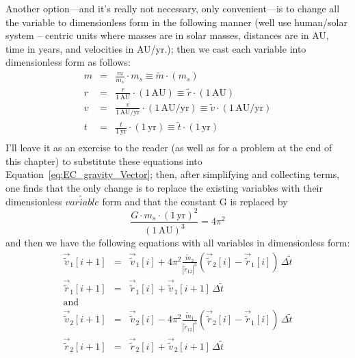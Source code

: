 Another option---and it's really not necessary, only convenient---is to change all the variable to dimensionless form in the following manner (well use human/solar system -- centric units where masses are in solar masses, distances are in AU, time in years, and velocities in AU/yr.); then we cast each variable into dimensionless form as follows:
\begin{eqnarray}
	m & = & \frac{m}{m_s}\cdot m_s   \equiv  \tilde{m} \cdot (m_s)\nonumber \\
	r & = & \frac{r}{1\,\mathrm{AU}} \cdot (1\,\mathrm{AU})  \equiv \tilde{r}\cdot (1\,\mathrm{AU})\nonumber \\
	v & = & \frac{v}{1\,\mathrm{AU/yr}}\cdot (1\,\mathrm{AU/yr})  \equiv  \tilde{v} \cdot (1\,\mathrm{AU/yr}) \nonumber \\
	t & = & \frac{t}{1\,\mathrm{yr}} \cdot (1\,\mathrm{yr})  \equiv  \tilde{t} \cdot (1\,\mathrm{yr})\nonumber \\
	\label{eq:dimensionless}
\end{eqnarray}
I'll leave it as an exercise to the reader (as well as for a problem at the end of this chapter) to substitute these equations into Equation~\ref{eq:EC_gravity_Vector}; then, after simplifying and collecting terms, one finds that the only change is to replace the existing variables with their dimensionless $\tilde{variable}$ form and that the constant G is replaced by 
$$ \frac{G\cdot m_s \cdot (1\,\mathrm{yr})^2}{(1\,\mathrm{AU})^3}  = 4\pi^2$$
and then we have the following equations with all variables in dimensionless form:
\begin{eqnarray}
\vec{\tilde{v}}_1[i+1] & = & \vec{\tilde{v}}_1[i] + 4\pi^2\frac{\tilde{m}_2}{ |\tilde{r}_{12}|^3 }\left( \vec{\tilde{r}}_2[i] - \vec{\tilde{r}}_1[i] \right) \,\Delta \tilde{t} \nonumber \\
\vec{\tilde{r}}_1[i+1] & = & \vec{\tilde{r}}_1[i] + \vec{\tilde{v}}_{1}[i+1]\,\Delta \tilde{t} \nonumber \\
\mathrm{and} &   & \nonumber \\[2mm]
\vec{\tilde{v}}_2[i+1] & = & \vec{\tilde{v}}_2[i] - 4\pi^2\frac{\tilde{m}_1}{ |\tilde{r}_{12}|^3 }\left( \vec{\tilde{r}}_2[i] - \vec{\tilde{r}}_1[i] \right) \,\Delta \tilde{t} \nonumber \\
\vec{\tilde{r}}_2[i+1] & = & \vec{\tilde{r}}_2[i] + \vec{\tilde{v}}_{2}[i+1]\,\Delta \tilde{t} \nonumber \\
\label{eq:EC_gravity_VectorDimensionless}
\end{eqnarray}


